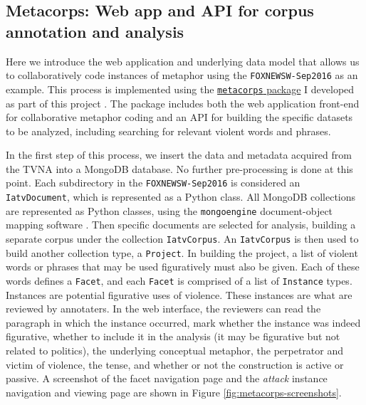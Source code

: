 \subsection{Metacorps: Web app and API for corpus annotation and analysis}
\label{sub:corpus-annotation}

Here we introduce the web application and underlying data model that allows us
to collaboratively code instances of metaphor using the \texttt{FOXNEWSW-Sep2016} as
an example. This process is implemented using the 
\href{http://github.com/mtpain/metacorps}{\texttt{metacorps} package} I developed
as part of this project \cite{Turner2017}. 
The package includes both the web application
front-end for collaborative metaphor coding and an API for building the 
specific datasets to be analyzed, including searching for relevant violent
words and phrases. 

In the first step of this process, we insert the data and metadata
acquired from the TVNA into a MongoDB database. No further pre-processing is done 
at this point.
Each subdirectory in the \texttt{FOXNEWSW-Sep2016} is considered an \texttt{IatvDocument},
which is represented as a Python class. All MongoDB collections are represented
as Python classes, using the \texttt{mongoengine} document-object mapping software
\cite{Mongoengine2017}. Then specific documents are selected for analysis, 
building a separate corpus under the collection \texttt{IatvCorpus}. 
An \texttt{IatvCorpus} is then used to build another collection type, a
\texttt{Project}. In building the project, a list of 
violent words or phrases that may be used figuratively must also be given.
Each of these words defines a \texttt{Facet}, and each \texttt{Facet} is comprised
of a list of \texttt{Instance} types. Instances are potential figurative uses
of violence. These instances are what are reviewed by annotaters.
In the web interface, the reviewers can read the paragraph in which the
instance occurred, mark whether the instance was indeed figurative, whether to
include it in the analysis (it may be figurative but not related to politics),
the underlying conceptual metaphor, the perpetrator and victim of violence,
the tense, and whether or not the construction is active or passive. A 
screenshot of the facet navigation page and the \textit{attack} instance
navigation and viewing page are shown in Figure \ref{fig:metacorps-screenshots}.

